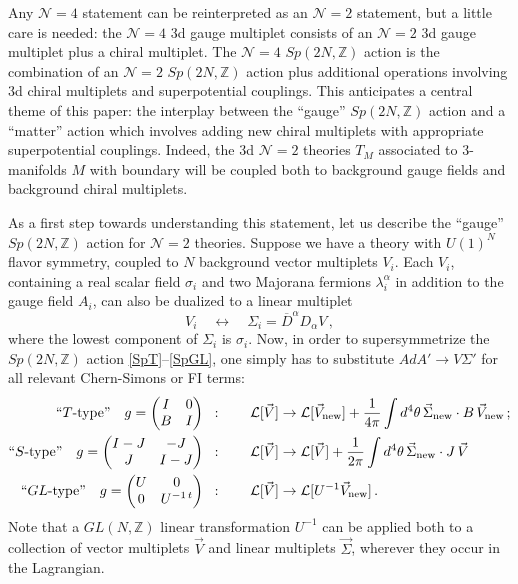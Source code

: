\documentclass[hyper,letterpaper]{JHEP3}
\numberwithin{equation}{section}
\newcommand{\be}{\begin{equation}}
\newcommand{\ee}{\end{equation}}
\newcommand{\ol}{\overline}
\newcommand{\Z}{{\mathbb Z}}
\newcommand{\CL}{\mathcal{L}}
\newcommand{\CN}{\mathcal{N}}
\begin{document}
Any $\CN=4$ statement can be reinterpreted as an $\CN=2$ statement, but a little care is needed: the $\CN=4$ 3d gauge multiplet consists of an $\CN=2$ 3d gauge multiplet plus a chiral multiplet.  The $\CN=4$ $Sp(2N,\Z)$ action is the combination of an $\CN=2$ $Sp(2N,\Z)$ action plus additional operations involving 3d chiral multiplets and superpotential couplings. This anticipates a central theme of this paper: the interplay between the ``gauge'' $Sp(2N,\Z)$ action and a ``matter'' action which involves adding new chiral multiplets with appropriate superpotential couplings.
Indeed, the 3d $\CN=2$ theories $T_M$ associated to 3-manifolds $M$ with boundary will be coupled both to background gauge fields and background chiral multiplets.


As a first step towards understanding this statement, let us describe the ``gauge'' $Sp(2N,\Z)$ action for $\CN=2$ theories. Suppose we have a theory with $U(1)^N$ flavor symmetry, coupled to $N$ background vector multiplets $V_i$. Each $V_i$, containing a real scalar field $\sigma_i$ and two Majorana fermions $\lambda^\alpha_i$ in addition to the gauge field $A_i$, can also be dualized to a linear multiplet \cite{AHISS, NishinoGates}
%
\be V_i\quad\leftrightarrow\quad \Sigma_i = \ol{D}^\alpha D_\alpha V\,, \ee
%
where the lowest component of $\Sigma_i$ is $\sigma_i$. Now, in order to supersymmetrize the $Sp(2N,\Z)$ action \eqref{SpT}--\eqref{SpGL}, one simply has to substitute $AdA'\to V\Sigma'$ for all relevant Chern-Simons or FI terms:
%
\begin{align} \text{``$T$-type''}\quad g=\begin{pmatrix} I & 0 \\ B & I \end{pmatrix} \;\;&:\qquad \CL[\vec{V}]\to\CL[\vec{V}_{\rm new}]+\frac{1}{4\pi}\int d^4\theta\,\vec\Sigma_{\rm new} \cdot B\,\vec V_{\rm new}\,; \label{Sp2T} \\
%
\text{``$S$-type''}\quad g= \begin{pmatrix}I-J & -J \\ J & I-J \end{pmatrix}\;\;&:\qquad \CL[\vec V]\to\CL[\vec V]+\frac{1}{2\pi}\int d^4\theta\, \vec{\Sigma}_{\rm new}\cdot J\,\vec V\, \label{Sp2S} \\
%
\text{``$GL$-type''}\quad g = \begin{pmatrix} U & 0 \\ 0 & U^{-1\,t}\end{pmatrix}\;\;&:\qquad \CL[\vec V]\to \CL[U^{-1}\vec V_{\rm new}]\,. \label{Sp2GL}
\end{align}
Note that a $GL(N,\Z)$ linear transformation $U^{-1}$ can be applied both to a collection of vector multiplets $\vec V$ and linear multiplets $\vec \Sigma$, wherever they occur in the Lagrangian.
\end{document}
